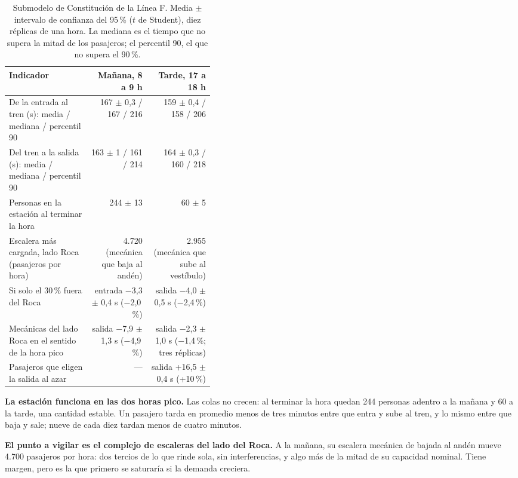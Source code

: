 \documentclass{article}
\begin{document}
\begin{table}[htbp]
  \centering\small
  \caption{Submodelo de Constitución de la Línea F. Media $\pm$ intervalo de confianza del 95\,\% ($t$ de
  Student), diez réplicas de una hora. La mediana es el tiempo que no supera la mitad de los pasajeros; el percentil 90,
  el que no supera el 90\,\%.}
  \label{tab:peatonal}
  \begin{tabularx}{\linewidth}{>{\raggedright\arraybackslash}p{0.40\linewidth}RR}
    \toprule
    Indicador & Mañana, 8 a 9 h & Tarde, 17 a 18 h \\
    \midrule
    De la entrada al tren (s): media / mediana / percentil 90 & 167 $\pm$ 0,3 / 167 / 216 & 159 $\pm$ 0,4 / 158 / 206 \\
    Del tren a la salida (s): media / mediana / percentil 90 & 163 $\pm$ 1 / 161 / 214 & 164 $\pm$ 0,3 / 160 / 218 \\
    Personas en la estación al terminar la hora & 244 $\pm$ 13 & 60 $\pm$ 5 \\
    Escalera más cargada, lado Roca (pasajeros por hora) & 4.720 (mecánica que baja al andén) & 2.955 (mecánica que sube al vestíbulo) \\
    Si solo el 30\,\% fuera del Roca & entrada $-$3,3 $\pm$ 0,4 s ($-$2,0\,\%) & salida $-$4,0 $\pm$ 0,5 s ($-$2,4\,\%) \\
    Mecánicas del lado Roca en el sentido de la hora pico & salida $-$7,9 $\pm$ 1,3 s ($-$4,9\,\%) & salida $-$2,3 $\pm$ 1,0 s ($-$1,4\,\%; tres réplicas) \\
    Pasajeros que eligen la salida al azar & --- & salida +16,5 $\pm$ 0,4 s (+10\,\%) \\
    \bottomrule
  \end{tabularx}
\end{table}

\textbf{La estación funciona en las dos horas pico.} Las colas no crecen: al terminar la hora quedan 244
personas adentro a la mañana y 60 a la tarde, una cantidad estable. Un pasajero tarda en promedio menos de
tres minutos entre que entra y sube al tren, y lo mismo entre que baja y sale; nueve de cada diez tardan menos
de cuatro minutos.

\textbf{El punto a vigilar es el complejo de escaleras del lado del Roca.} A la mañana, su escalera mecánica
de bajada al andén mueve 4.700 pasajeros por hora: dos tercios de lo que rinde sola, sin interferencias, y
algo más de la mitad de su capacidad nominal. Tiene margen, pero es la que primero se saturaría si la
demanda creciera.
\end{document}
